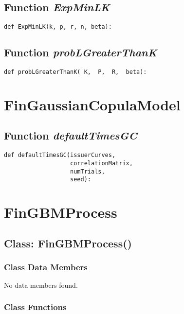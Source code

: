 \documentclass[twoside,11pt]{book}
\begin{document}
\subsection{Function {\it ExpMinLK}}


\begin{lstlisting}
def ExpMinLK(k, p, r, n, beta):
\end{lstlisting}

\subsection{Function {\it probLGreaterThanK}}


\begin{lstlisting}
def probLGreaterThanK( K,  P,  R,  beta):
\end{lstlisting}

\newpage
\section{FinGaussianCopulaModel}

\subsection{Function {\it defaultTimesGC}}


\begin{lstlisting}
def defaultTimesGC(issuerCurves, 
                   correlationMatrix, 
                   numTrials, 
                   seed):
\end{lstlisting}

\newpage
\section{FinGBMProcess}

\subsection{Class: FinGBMProcess()}


\subsubsection{Class Data Members}
No data members found.

\subsubsection{Class Functions}
\end{document}
